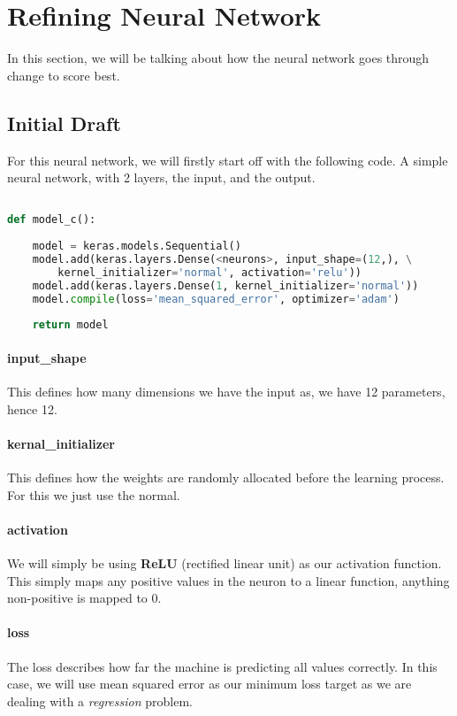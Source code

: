 

\section{Refining Neural Network}

In this section, we will be talking about how the neural network goes through change to score best.

\subsection{Initial Draft}

For this neural network, we will firstly start off with the following code. A simple neural network, with 2 layers, the input, and the output.

\begin{lstlisting}[language=Python]

def model_c():
    
    model = keras.models.Sequential()
    model.add(keras.layers.Dense(<neurons>, input_shape=(12,), \
		kernel_initializer='normal', activation='relu'))
    model.add(keras.layers.Dense(1, kernel_initializer='normal'))
    model.compile(loss='mean_squared_error', optimizer='adam')
   
    return model

\end{lstlisting}

\paragraph{input\_shape} This defines how many dimensions we have the input as, we have 12 parameters, hence 12.

\paragraph{kernal\_initializer} This defines how the weights are randomly allocated before the learning process. For this we just use the normal.

\paragraph{activation} We will simply be using \textbf{ReLU} (rectified linear unit) as our activation function. This simply maps any positive values in the neuron to a linear function, anything non-positive is mapped to 0.

\paragraph{loss} The loss describes how far the machine is predicting all values correctly. In this case, we will use mean squared error as our minimum loss target as we are dealing with a \textit{regression} problem.

